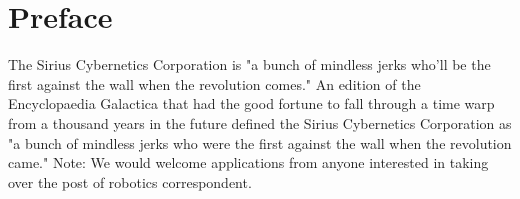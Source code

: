 \thispagestyle{empty}
\section*{Preface}
The Sirius Cybernetics Corporation is "a bunch of mindless jerks who'll be the first against the wall when the revolution comes." An edition of the Encyclopaedia Galactica that had the good fortune to fall through a time warp from a thousand years in the future defined the Sirius Cybernetics Corporation as "a bunch of mindless jerks who were the first against the wall when the revolution came." Note: We would welcome applications from anyone interested in taking over the post of robotics correspondent. 